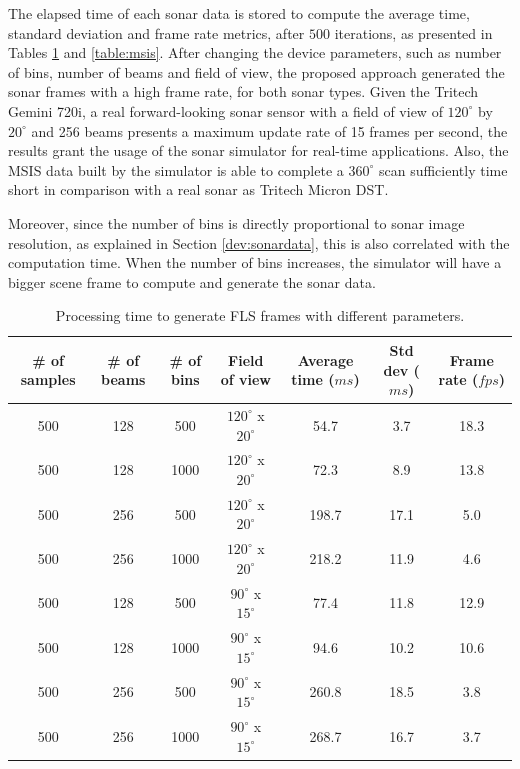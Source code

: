 \documentclass[final,5p,times]{elsarticle}
\begin{document}
The elapsed time of each sonar data is stored to compute the average time, standard deviation and frame rate metrics, after $500$ iterations, as presented in Tables \ref{table:fls} and \ref{table:msis}. After changing the device parameters, such as number of bins, number of beams and field of view, the proposed approach generated the sonar frames with a high frame rate, for both sonar types. Given the Tritech Gemini 720i, a real forward-looking sonar sensor with a field of view of $120^{\circ}$ by $20^{\circ}$ and 256 beams presents a maximum update rate of 15 frames per second, the results grant the usage of the sonar simulator for real-time applications. Also, the MSIS data built by the simulator is able to complete a $360^{\circ}$ scan sufficiently time short in comparison with a real sonar as Tritech Micron DST.

Moreover, since the number of bins is directly proportional to sonar image resolution, as explained in Section \ref{dev:sonardata}, this is also correlated with the computation time. When the number of bins increases, the simulator will have a bigger scene frame to compute and generate the sonar data.

\begin{table}[!h]
    \caption{Processing time to generate FLS frames with different parameters.}
    \label{table:fls}
    \begin{center}
        \begin{tabular}{| c | c | c | c | c | c | c |}
            \hline
            \# of samples & \# of beams & \# of bins & Field of view & Average time ($ms$) & Std dev ($ms$) & Frame rate ($fps$) \\
            \hline
            500     & 128     & 500       & $120^{\circ}$ x $20^{\circ}$        & 54.7    & 3.7   & 18.3 \\ \hline
            500     & 128     & 1000      & $120^{\circ}$ x $20^{\circ}$        & 72.3	& 8.9   & 13.8 \\ \hline
            500     & 256     & 500       & $120^{\circ}$ x $20^{\circ}$        & 198.7	& 17.1  & 5.0  \\ \hline
            500     & 256     & 1000      & $120^{\circ}$ x $20^{\circ}$        & 218.2	& 11.9  & 4.6  \\ \hline
            500     & 128     & 500       & $90^{\circ}$ x $15^{\circ}$         & 77.4	& 11.8  & 12.9 \\ \hline
            500     & 128     & 1000      & $90^{\circ}$ x $15^{\circ}$         & 94.6	& 10.2  & 10.6 \\ \hline
            500     & 256     & 500       & $90^{\circ}$ x $15^{\circ}$         & 260.8	& 18.5  & 3.8  \\ \hline
            500     & 256     & 1000      & $90^{\circ}$ x $15^{\circ}$         & 268.7	& 16.7  & 3.7  \\ \hline
        \end{tabular}
    \end{center}
\end{table}
\end{document}
